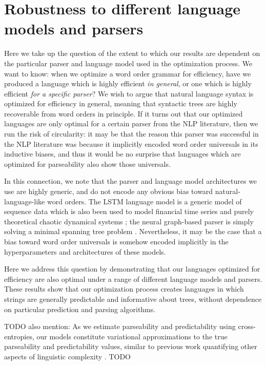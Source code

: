 \documentclass[10pt,twoside,lineno]{article}
\begin{document}
\section{Robustness to different language models and parsers}


Here we take up the question of the extent to which our results are dependent on the particular parser and language model used in the optimization process. We want to know: when we optimize a word order grammar for efficiency, have we produced a language which is highly efficient \emph{in general}, or one which is highly efficient \emph{for a specific parser}? We wish to argue that natural language syntax is optimized for efficiency in general, meaning that syntactic trees are highly recoverable from word orders in principle. If it turns out that our optimized languages are only optimal for a certain parser from the NLP literature, then we run the risk of circularity: it may be that the reason this parser was successful in the NLP literature was because it implicitly encoded word order universals in its inductive biases, and thus it would be no surprise that languages which are optimized for parseability also show those universals.

In this connection, we note that the parser and language model architectures we use are highly generic, and do not encode any obvious bias toward natural-language-like word orders. The LSTM language model is a generic model of sequence data which is also been used to model financial time series \citep{sirignano2018universal} and purely theoretical chaotic dynamical systems \citep{ogunmolu2016nonlinear}; the neural graph-based parser is simply solving a minimal spanning tree problem \citep{mcdonald2005nonprojective}. Nevertheless, it may be the case that a bias toward word order universals is somehow encoded implicitly in the hyperparameters and architectures of these models.

Here we address this question by demonstrating that our languages optimized for efficiency are also optimal under a range of different language models and parsers. These results show that our optimization process creates languages in which strings are generally predictable and informative about trees, without dependence on particular prediction and parsing algorithms.

TODO also mention: As we estimate parseability and predictability using cross-entropies, our models constitute variational approximations to the true parseability and predictability values, similar to previous work quantifying other aspects of linguistic complexity \citep{cotterell2019complexity}.
TODO
\end{document}
